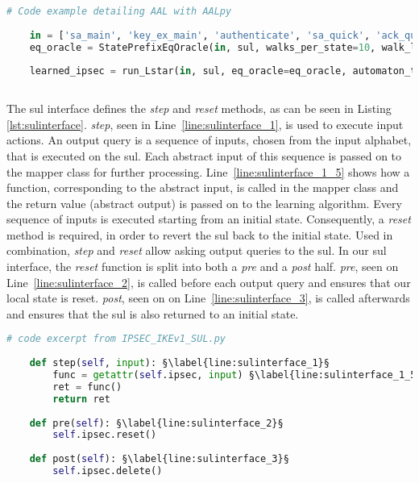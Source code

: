 \begin{lstlisting}[float=h, caption=Model-learning framework initialisation code excerpt., label=lst:eqcode, language=python, escapechar=§]
	# Code example detailing AAL with AALpy
	
	in = ['sa_main', 'key_ex_main', 'authenticate', 'sa_quick', 'ack_quick'] §\label{line:eqcode_1}§
	eq_oracle = StatePrefixEqOracle(in, sul, walks_per_state=10, walk_len=10) §\label{line:eqcode_2}§
	
	learned_ipsec = run_Lstar(in, sul, eq_oracle=eq_oracle, automaton_type='mealy', cache_and_non_det_check=True) §\label{line:eqcode_3}§
	
\end{lstlisting}

The \ac{sul} interface defines the \emph{step} and \emph{reset} methods, as can be seen in Listing \ref{lst:sulinterface}. \emph{step}, seen in Line~\ref{line:sulinterface_1}, is used to execute input actions. An output query is a sequence of inputs, chosen from the input alphabet, that is executed on the \ac{sul}. Each abstract input of this sequence is passed on to the mapper class for further processing. Line~\ref{line:sulinterface_1_5} shows how a function, corresponding to the abstract input, is called in the mapper class and the return value (abstract output) is passed on to the learning algorithm. Every sequence of inputs is executed starting from an initial state. Consequently, a \emph{reset} method is required, in order to revert the \ac{sul} back to the initial state. Used in combination, \emph{step} and \emph{reset} allow asking output queries to the \ac{sul}. In our \ac{sul} interface, the \emph{reset} function is split into both a \emph{pre} and a \emph{post} half. \emph{pre}, seen on Line~\ref{line:sulinterface_2}, is called before each output query and ensures that our local state is reset. \emph{post}, seen on on Line~\ref{line:sulinterface_3}, is called afterwards and ensures that the \ac{sul} is also returned to an initial state.  

\begin{lstlisting}[float=h, caption=SUL interface methods code excerpt., label=lst:sulinterface, language=python, escapechar=§]
	# code excerpt from IPSEC_IKEv1_SUL.py
	
	def step(self, input): §\label{line:sulinterface_1}§
		func = getattr(self.ipsec, input) §\label{line:sulinterface_1_5}§
		ret = func()
		return ret
	
	def pre(self): §\label{line:sulinterface_2}§
		self.ipsec.reset()
	
	def post(self): §\label{line:sulinterface_3}§
		self.ipsec.delete()
\end{lstlisting}

